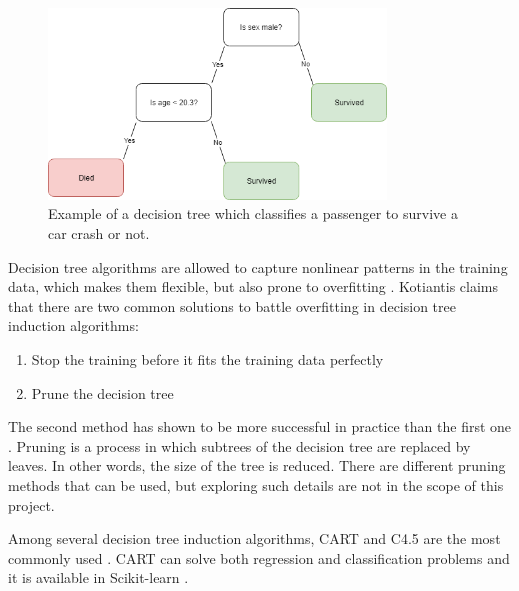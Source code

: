 \begin{figure}[H] 
	\centering
	\includegraphics[width=0.8\textwidth]{media/decisiontree_example.png}
	\caption{Example of a decision tree which classifies a passenger to survive a car crash or not.}
	\label{fig:decisiontree_example}
\end{figure}

		Decision tree algorithms are allowed to capture nonlinear patterns in the training data, which makes them flexible, but also prone to overfitting \cite{BOOK:7}. Kotiantis \cite{ARTICLE:7} claims that there are two common solutions to battle overfitting in decision tree induction algorithms:
		\begin{enumerate}
			\item Stop the training before it fits the training data perfectly
			\item Prune the decision tree
		\end{enumerate}
		The second method has shown to be more successful in practice than the first one \cite{BOOK:8}. Pruning is a process in which subtrees of the decision tree are replaced by leaves. In other words, the size of the tree is reduced. There are different pruning methods that can be used, but exploring such details are not in the scope of this project.

		 Among several decision tree induction algorithms, CART and C4.5 are the most commonly used \cite{BOOK:8}. CART can solve both regression and classification problems and it is available in Scikit-learn \cite{WEBSITE:16}. %
		
